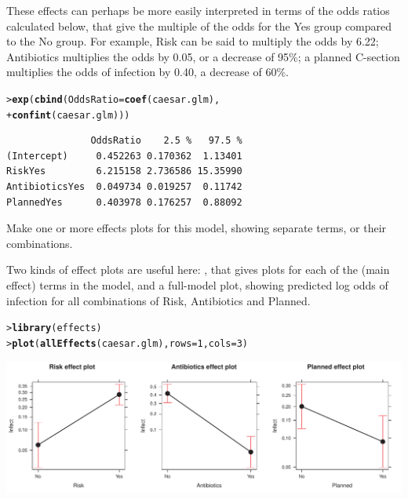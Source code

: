\documentclass[10pt]{report}\usepackage[]{graphicx}\usepackage[]{color}
\makeatletter
\newcommand{\hlnum}[1]{\textcolor[rgb]{0.686,0.059,0.569}{#1}}%
\newcommand{\hlstd}[1]{\textcolor[rgb]{0.345,0.345,0.345}{#1}}%
\newcommand{\hlkwc}[1]{\textcolor[rgb]{0.333,0.667,0.333}{#1}}%
\newcommand{\hlkwd}[1]{\textcolor[rgb]{0.737,0.353,0.396}{\textbf{#1}}}%
\newenvironment{kframe}{%
 \def\at@end@of@kframe{}%
 \ifinner\ifhmode%
  \def\at@end@of@kframe{\end{minipage}}%
  \begin{minipage}{\columnwidth}%
 \fi\fi%
 \def\FrameCommand##1{\hskip\@totalleftmargin \hskip-\fboxsep
 \colorbox{shadecolor}{##1}\hskip-\fboxsep
     \hskip-\linewidth \hskip-\@totalleftmargin \hskip\columnwidth}%
 \MakeFramed {\advance\hsize-\width
   \@totalleftmargin\z@ \linewidth\hsize
   \@setminipage}}%
 {\par\unskip\endMakeFramed%
 \at@end@of@kframe}
\newenvironment{knitrout}{}{} %
\renewenvironment{knitrout}{\small\renewcommand{\baselinestretch}{.85}}{} %
\makeatother
\begin{document}
\begin{Exercises}
\begin{enumerate*}
\begin{ans}
    These effects can perhaps be more easily interpreted in terms of the odds ratios
    calculated below, that give the multiple of the odds for the Yes group compared
    to the No group.  For example, Risk can be said to multiply the odds by 6.22;
    Antibiotics multiplies the odds by 0.05, or a decrease of 95\%; a planned
    C-section multiplies the odds of infection by 0.40, a decrease of 60\%.
\begin{knitrout}\footnotesize
{}\color{fgcolor}\begin{kframe}
\begin{alltt}
\hlstd{> }\hlkwd{exp}\hlstd{(}\hlkwd{cbind}\hlstd{(}\hlkwc{OddsRatio}\hlstd{=}\hlkwd{coef}\hlstd{(caesar.glm),}
\hlstd{+ }          \hlkwd{confint}\hlstd{(caesar.glm)))}
\end{alltt}
\begin{verbatim}
               OddsRatio    2.5 %   97.5 %
(Intercept)     0.452263 0.170362  1.13401
RiskYes         6.215158 2.736586 15.35990
AntibioticsYes  0.049734 0.019257  0.11742
PlannedYes      0.403978 0.176257  0.88092
\end{verbatim}
\end{kframe}
\end{knitrout}

    \end{ans}

    \item Make one or more effects plots for this model, showing separate terms, or their
    combinations.
    \begin{ans}
    Two kinds of effect plots are useful here: , that gives plots for each of
    the (main effect) terms in the model, and a full-model plot, showing predicted log odds
    of infection for all combinations of Risk, Antibiotics and Planned.
\begin{knitrout}\footnotesize
{}\color{fgcolor}\begin{kframe}
\begin{alltt}
\hlstd{> }\hlkwd{library}\hlstd{(effects)}
\hlstd{> }\hlkwd{plot}\hlstd{(}\hlkwd{allEffects}\hlstd{(caesar.glm),} \hlkwc{rows}\hlstd{=}\hlnum{1}\hlstd{,} \hlkwc{cols}\hlstd{=}\hlnum{3}\hlstd{)}
\end{alltt}
\end{kframe}

\centerline{\includegraphics[width=\textwidth]{soln/fig/ex7_5d1-1} }




\end{knitrout}
\end{ans}
\end{enumerate*}
\end{Exercises}
\end{document}

